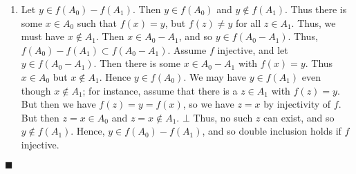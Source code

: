 \documentclass[12pt]{article}
\renewcommand{\qed}{\hfill$\blacksquare$}
\renewenvironment{proof}{\begin{addmargin}[1em]{0em}\begin{newproof}}{\end{newproof}\end{addmargin}\qed}
\begin{document}
\begin{proof}
\begin{enumerate}[label=(\alph*)]
	\item Let $y \in f\left(A_0\right) - f\left(A_1\right)$. Then $y \in f\left(A_0\right)$ and $y \notin f\left(A_1\right)$. Thus there is some $x \in A_0$ such that $f\left(x\right)=y$, but $f\left(z\right)\neq y$ for all $z \in A_1$. Thus, we must have $x \notin A_1$. Then $x \in A_0 - A_1$, and so $y \in f\left(A_0 -A_1\right)$. Thus, $f\left(A_0\right)-f\left(A_1\right) \subset f\left(A_0 - A_1\right)$. Assume $f$ injective, and let $y\in f\left(A_0 -A_1\right)$. Then there is some $x \in A_0 - A_1$ with $f\left(x\right)=y$. Thus $x \in A_0$ but $x\notin A_1$. Hence $y \in f\left(A_0\right)$. We may have $y \in f\left(A_1\right)$ even though $x\notin A_1$; for instance, assume that there is a $z\in A_1$ with $f\left(z\right)=y$. But then we have $f\left(z\right) = y = f\left(x\right)$, so we have $z = x$ by injectivity of $f$. But then $z=x \in A_0$ and $z=x \notin A_1$. $\bot$  Thus, no such $z$ can exist, and so $y \notin f\left(A_1\right)$. Hence, $y \in f\left(A_0\right)-f\left(A_1\right)$, and so double inclusion holds if $f$ injective.
\end{enumerate}
\end{proof}
\end{document}
